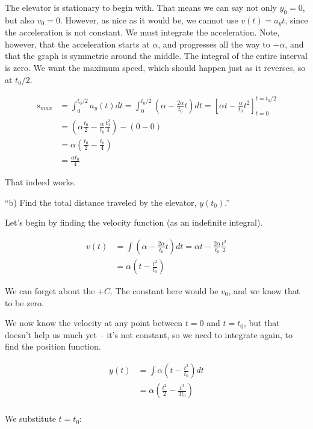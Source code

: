 \documentclass[12pt,a4paper]{report}
\begin{document}
The elevator is stationary to begin with. That means we can say not only $y_0 = 0$, but also $v_0 = 0$. However, as nice as it would be, we cannot use $v(t) = a_y t$, since the acceleration is not constant. We must integrate the acceleration. Note, however, that the acceleration starts at $\alpha$, and progresses all the way to $-\alpha$, and that the graph is symmetric around the middle. The integral of the entire interval is zero. We want the maximum speed, which should happen just as it reverses, so at $t_0/2$.

\begin{align}
s_{max} &= \int_0^{t_0/2} a_y(t) dt = \int_0^{t_0/2} \left( \alpha - \frac{2\alpha}{t_0} t \right) dt = \left[\alpha t - \frac{\alpha}{t_0} t^2\right]_{t=0}^{t=t_0/2}\\
        &= \left(\alpha \frac{t_0}{2} - \frac{\alpha}{t_0} \frac{t_0^2}{4} \right) - (0 - 0)\\
        &= \alpha \left(\frac{t_0}{2} - \frac{t_0}{4} \right)\\
        &= \frac{\alpha t_0}{4}
\end{align}

That indeed works.

``b) Find the total distance traveled by the elevator, $y(t_0)$.''

Let's begin by finding the velocity function (as an indefinite integral).

\begin{align}
v(t) &= \int \left( \alpha - \frac{2\alpha}{t_0} t \right) dt  = \alpha t - \frac{2\alpha}{t_0} \frac{t^2}{2}\\
     &= \alpha \left( t - \frac{t^2}{t_0} \right)
\end{align}

We can forget about the $+ C$. The constant here would be $v_0$, and we know that to be zero.

We now know the velocity at any point between $t = 0$ and $t = t_0$, but that doesn't help us much yet -- it's not constant, so we need to integrate again, to find the position function.

\begin{align}
y(t) &= \int \alpha \left( t - \frac{t^2}{t_0} \right) dt\\
     &= \alpha\left( \frac{t^2}{2} - \frac{t^3}{3t_0} \right)\\
\end{align}

We substitute $t = t_0$:
\end{document}
